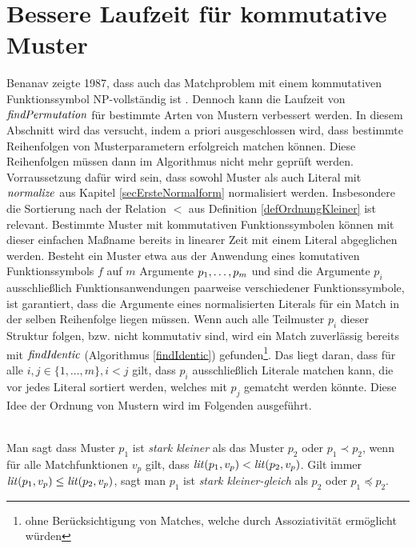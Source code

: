 \section{Bessere Laufzeit für kommutative Muster} \label{subsecCMuster}

Benanav zeigte 1987, dass auch das Matchproblem mit einem kommutativen Funktionssymbol NP-vollständig ist \cite{NPHardMatching}. Dennoch kann die Laufzeit von $\mathit{findPermutation}$ für bestimmte Arten von Mustern verbessert werden. In diesem Abschnitt wird das versucht, indem a priori ausgeschlossen wird, dass bestimmte Reihenfolgen von Musterparametern erfolgreich matchen können. Diese Reihenfolgen müssen dann im Algorithmus nicht mehr geprüft werden.
Vorraussetzung dafür wird sein, dass sowohl Muster als auch Literal mit $\mathit{normalize}$ aus Kapitel \ref{secErsteNormalform} normalisiert werden. Insbesondere die Sortierung nach der Relation $<$ aus Definition \ref{defOrdnungKleiner} ist relevant.
Bestimmte Muster mit kommutativen Funktionssymbolen können mit dieser einfachen Maßname bereits in linearer Zeit mit einem Literal abgeglichen werden. Besteht ein Muster etwa aus der Anwendung eines komutativen Funktionssymbols $f$ auf $m$ Argumente ${p}_{1}, \dots, {p}_{m}$ und sind die Argumente $p_i$ ausschließlich Funktionsanwendungen paarweise verschiedener Funktionssymbole, ist garantiert, dass die Argumente eines normalisierten Literals für ein Match in der selben Reihenfolge liegen müssen. Wenn auch alle Teilmuster $p_i$ dieser Struktur folgen, bzw. nicht kommutativ sind, wird ein Match zuverlässig bereits mit $\mathit{findIdentic}$ (Algorithmus \ref{findIdentic}) gefunden\footnote{ohne Berücksichtigung von Matches, welche durch Assoziativität ermöglicht würden}. Das liegt daran, dass für alle $i, j \in \{1, \dots, m\}, i < j$ gilt, dass $p_i$ ausschließlich Literale matchen kann, die vor jedes Literal sortiert werden, welches mit $p_j$ gematcht werden könnte. Diese Idee der Ordnung von Mustern wird im Folgenden ausgeführt.


\begin{definition}~\\
Man sagt dass Muster $p_1$ ist \emph{stark kleiner} als das Muster $p_2$ oder $p_1 \prec p_2$, wenn für alle Matchfunktionen $v_p$ gilt, dass $\mathit{lit}(p_1, v_p) < \mathit{lit}(p_2, v_p)$. Gilt immer $\mathit{lit}(p_1, v_p) \leq \mathit{lit}(p_2, v_p)$, sagt man $p_1$ ist \emph{stark kleiner-gleich} als $p_2$ oder $p_1 \preceq p_2$.
\end{definition}


